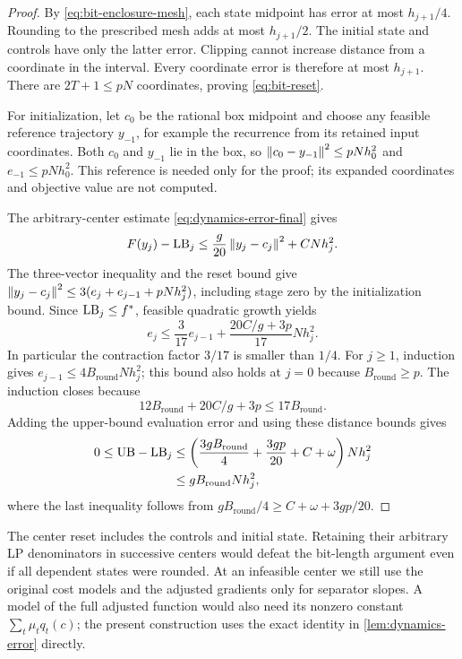\begin{proof}
By \cref{eq:bit-enclosure-mesh}, each state midpoint has error at most
$h_{j+1}/4$.  Rounding to the prescribed mesh adds at most
$h_{j+1}/2$.  The initial state and controls have only the latter error.
Clipping cannot increase distance from a coordinate in the interval.
Every coordinate error is therefore at most $h_{j+1}$.  There are
$2T+1\le pN$ coordinates, proving \cref{eq:bit-reset}.

For initialization, let $c_0$ be the rational box midpoint and choose any
feasible reference trajectory $y_{-1}$, for example the recurrence from
its retained input coordinates.  Both $c_0$ and $y_{-1}$ lie in the box,
so $\left\lVert c_0-y_{-1}\right\rVert^2\le pNh_0^2$ and
$e_{-1}\le pNh_0^2$.  This reference is needed only for the proof;
its expanded coordinates and objective value are not computed.

The arbitrary-center estimate \cref{eq:dynamics-error-final} gives
\[
 F(y_j)-\mathrm{LB}_j\le\frac g{20}\left\lVert y_j-c_j\right\rVert^2+CNh_j^2.
\]
The three-vector inequality and the reset bound give
$\left\lVert y_j-c_j\right\rVert^2\le3(e_j+e_{j-1}+pNh_j^2)$, including stage zero
by the initialization bound.  Since $\mathrm{LB}_j\le f^*$, feasible quadratic
growth yields
\begin{equation}
 e_j\le\frac3{17}e_{j-1}
              +\frac{20C/g+3p}{17}Nh_j^2.
 \label{eq:bit-rounded-recursion}
\end{equation}
In particular the contraction factor $3/17$ is smaller than $1/4$.
For $j\ge1$, induction gives
$e_{j-1}\le4B_{\mathrm{round}}Nh_j^2$; this bound also holds at
$j=0$ because $B_{\mathrm{round}}\ge p$.  The induction closes because
\[
 12B_{\mathrm{round}}+20C/g+3p\le17B_{\mathrm{round}}.
\]
Adding the upper-bound evaluation error and using these distance bounds
gives
\begin{align*}
 0\le\mathrm{UB}-\mathrm{LB}_j
 &\le\left(\frac{3gB_{\mathrm{round}}}4+\frac{3gp}{20}
                        +C+\omega\right)Nh_j^2\\
 &\le gB_{\mathrm{round}}Nh_j^2,
\end{align*}
where the last inequality follows from
$gB_{\mathrm{round}}/4\ge C+\omega+3gp/20$.
\end{proof}

The center reset includes the controls and initial state.  Retaining their
arbitrary LP denominators in successive centers would defeat the bit-length
argument even if all dependent states were rounded.  At an infeasible
center we still use the original cost models and the adjusted gradients
only for separator slopes.  A model of the full adjusted function would
also need its nonzero constant $\sum_t\mu_tq_t(c)$; the present construction
uses the exact identity in \cref{lem:dynamics-error} directly.

